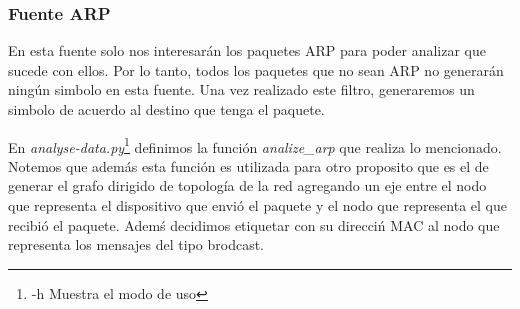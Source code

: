 \subsubsection{Fuente ARP}

En esta fuente solo nos interesar\'an los paquetes ARP para poder analizar que
sucede con ellos. Por lo tanto, todos los paquetes que no sean ARP no
generar\'an ning\'un simbolo en esta fuente. Una vez realizado este filtro,
generaremos un simbolo de acuerdo al destino que tenga el paquete.

En \textit{analyse-data.py}\footnote{-h Muestra el modo de uso} definimos la funci\'on \textit{analize\_arp} que
realiza lo mencionado. Notemos que adem\'as esta funci\'on es utilizada para
otro proposito que es el de generar el grafo dirigido de topolog\'ia de la red
agregando un eje entre el nodo que representa el dispositivo que envi\'o el
paquete y el nodo que representa el que recibi\'o el paquete. Adem\'s decidimos
etiquetar con su direcci\'n MAC al nodo que representa los mensajes del tipo
brodcast.

